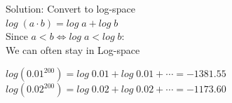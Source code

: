\begin{frame}
\center
Solution: Convert to log-space\\
$log \; (a \cdot b) = log \; a + log \; b$\\
\vspace{20pt}
Since $a < b \iff log \; a < log \; b$:\\
\vspace{20pt} 
We can often stay in Log-space
\end{frame}

\begin{frame}
\center
$log (0.01^{200}) = log \; 0.01 + log \; 0.01 + \cdots = -1381.55$\\
\vspace{20pt}
$log (0.02^{200}) = log \; 0.02 + log \; 0.02 + \cdots = -1173.60$
\end{frame}
